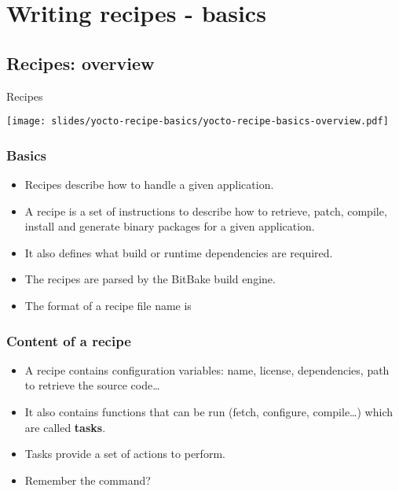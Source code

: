 \section{Writing recipes - basics}

\subsection{Recipes: overview}

\begin{frame}{Recipes}
  \begin{center}
    \texttt{[image: slides/yocto-recipe-basics/yocto-recipe-basics-overview.pdf]}
  \end{center}
\end{frame}

\begin{frame}
  \frametitle{Basics}
  \begin{itemize}
    \item Recipes describe how to handle a given application.
    \item A recipe is a set of instructions to describe how to
      retrieve, patch, compile, install and generate binary packages
      for a given application.
    \item It also defines what build or runtime dependencies are
      required.
    \item The recipes are parsed by the BitBake build engine.
    \item The format of a recipe file name is
  \end{itemize}
\end{frame}

\begin{frame}
  \frametitle{Content of a recipe}
  \begin{itemize}
    \item A recipe contains configuration variables: name, license,
      dependencies, path to retrieve the source code\dots
    \item It also contains functions that can be run (fetch,
      configure, compile\dots) which are called {\bf tasks}.
    \item Tasks provide a set of actions to perform.
    \item Remember the  command?
  \end{itemize}
\end{frame}

